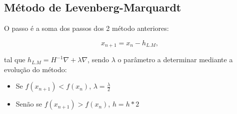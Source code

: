 \documentclass[../resumosMNUM.tex]{subfiles}
\begin{document}
\subsection{Método de Levenberg-Marquardt}

O passo é a soma dos passos dos 2 método anteriores:

\[x_{n+1} = x_n - h_{L.M},\]

tal que $h_{L.M} = H^{-1}\nabla + \lambda\nabla$, sendo $\lambda$ o parâmetro a determinar mediante a evolução do método:
\begin{itemize}
    \item Se $f(x_{n+1}) < f(x_n)$, $\lambda = \frac{\lambda}{2}$
    \item Senão se $f(x_{n+1}) > f(x_n)$, $h = h * 2$
\end{itemize}
\end{document}
